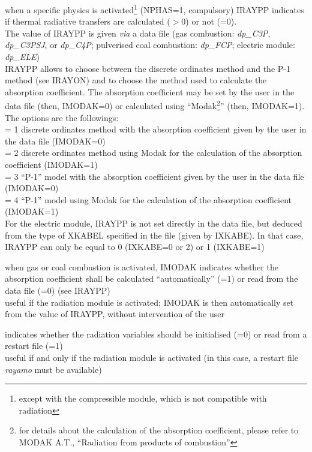 {when a specific physics is activated\footnote{except with the compressible
module, which is not compatible with radiation}
(NPHAS=1, compulsory) IRAYPP
indicates if thermal radiative transfers are calculated ($>0$) or not
(=0).\\
The value of IRAYPP is given {\em via} a data file (gas combustion:
{\em dp\_C3P}, {\em dp\_C3PSJ}, or {\em dp\_C4P};
pulverised coal combustion: {\em dp\_FCP}; electric module: {\em dp\_ELE})\\ 
IRAYPP allows to choose between the discrete ordinates method and the
P-1 method (see IRAYON) and to choose the method used to calculate the
absorption coefficient. The absorption coefficient may be set by the
user in the data file (then, \mbox{IMODAK=0}) or calculated using
``Modak\footnote{for details about the calculation of the absorption
coefficient, please refer to MODAK A.T., ``Radiation from products
of combustion''}'' (then, IMODAK=1).
The options are the followings:\\
\hspace*{1.3cm} = 1 discrete ordinates method with the absorption coefficient
given by the user in the data file (IMODAK=0)\\
\hspace*{1.3cm} = 2 discrete ordinates method using Modak for the
calculation of the absorption coefficient (IMODAK=1)\\
\hspace*{1.3cm} = 3 ``P-1'' model  with the absorption coefficient
given by the user in the data file (IMODAK=0)\\
\hspace*{1.3cm} = 4 ``P-1'' model using Modak for the
calculation of the absorption coefficient (IMODAK=1)\\
For the electric module, IRAYPP is not set directly in the data file, but
deduced from the type of XKABEL specified in the file (given by IXKABE).
In that case, IRAYPP can only be equal to 0 (IXKABE=0 or 2) or 1 (IXKABE=1)}

{when gas or coal combustion is activated, IMODAK indicates whether the 
absorption coefficient shall be calculated ``automatically'' (=1) or read from
the data file (=0) (see IRAYPP)\\
useful if the radiation module is activated; IMODAK is then automatically set
from the value of IRAYPP, without intervention of the user}

{indicates whether the radiation variables should be initialised (=0) or read
from a restart file (=1)\\
useful if and only if the radiation module is activated (in this case, a
restart file {\em rayamo} must be available)} 

